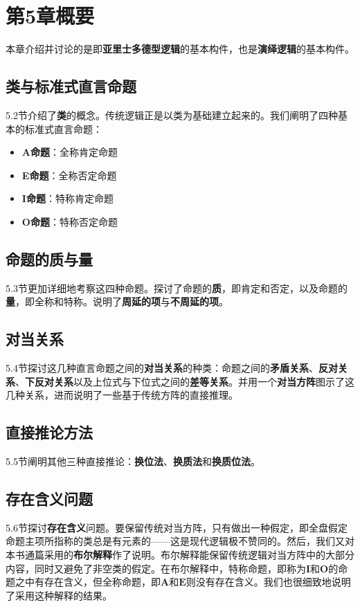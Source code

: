 \section{第5章概要}
本章介绍并讨论的是即\textbf{亚里士多德型逻辑}的基本构件，也是\textbf{演绎逻辑}的基本构件。

\subsection{类与标准式直言命题}
5.2节介绍了\textbf{类}的概念。传统逻辑正是以类为基础建立起来的。我们阐明了四种基本的标准式直言命题：

\begin{itemize}
  \item \textbf{A命题}：全称肯定命题
  \item \textbf{E命题}：全称否定命题
  \item \textbf{I命题}：特称肯定命题
  \item \textbf{O命题}：特称否定命题
\end{itemize}

\subsection{命题的质与量}
5.3节更加详细地考察这四种命题。探讨了命题的\textbf{质}，即肯定和否定，以及命题的\textbf{量}，即全称和特称。说明了\textbf{周延的项}与\textbf{不周延的项}。

\subsection{对当关系}
5.4节探讨这几种直言命题之间的\textbf{对当关系}的种类：命题之间的\textbf{矛盾关系}、\textbf{反对关系}、\textbf{下反对关系}以及上位式与下位式之间的\textbf{差等关系}。并用一个\textbf{对当方阵}图示了这几种关系，进而说明了一些基于传统方阵的直接推理。

\subsection{直接推论方法}
5.5节阐明其他三种直接推论：\textbf{换位法}、\textbf{换质法}和\textbf{换质位法}。

\subsection{存在含义问题}
5.6节探讨\textbf{存在含义}问题。要保留传统对当方阵，只有做出一种假定，即全盘假定命题主项所指称的类总是有元素的——这是现代逻辑极不赞同的。然后，我们又对本书通篇采用的\textbf{布尔解释}作了说明。布尔解释能保留传统逻辑对当方阵中的大部分内容，同时又避免了非空类的假定。在布尔解释中，特称命题，即称为$\mathbf{I}$和$\mathbf{O}$的命题之中有存在含义，但全称命题，即$\mathbf{A}$和$\mathbf{E}$则没有存在含义。我们也很细致地说明了采用这种解释的结果。

